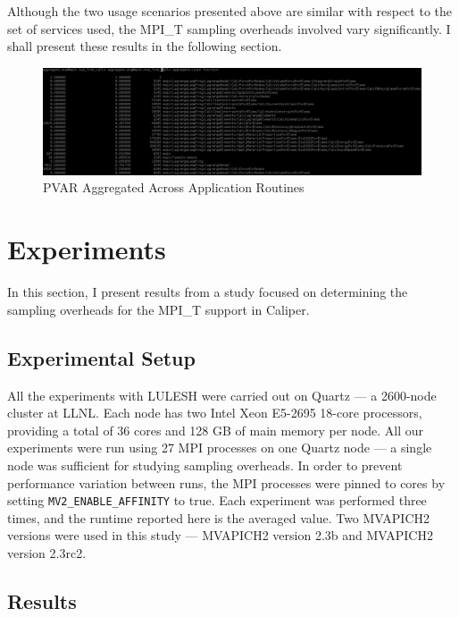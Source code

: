 \par Although the two usage scenarios presented above are similar with respect to the set of services used, the MPI\_T sampling overheads involved vary significantly. I shall present these results in the following section.
\begin{center}
	\begin{figure}[bp!]
         \centering
  \captionsetup{justification=centering}
		\includegraphics[scale=0.8, width=\columnwidth, keepaspectratio]{figures/CALIPER_app_counter_PVAR}
		\caption{PVAR Aggregated Across Application Routines}
		\label{fig:cali-app-counter}
	\end{figure}
\end{center}

\section{Experiments}
In this section, I present results from a study focused on determining the sampling overheads for the MPI\_T support in Caliper.
\subsection{Experimental Setup}
All the experiments with LULESH were carried out on Quartz --- a 2600-node cluster at LLNL. Each node has two Intel Xeon E5-2695 18-core processors, providing a total of 36 cores and 128 GB of main memory per node. All our experiments were run using 27 MPI processes on one Quartz node --- a single node was sufficient for studying sampling overheads. In order to prevent performance variation between runs, the MPI processes were pinned to cores by setting \verb+MV2_ENABLE_AFFINITY+ to true. Each experiment was performed three times, and the runtime reported here is the averaged value. Two MVAPICH2 versions were used in this study --- MVAPICH2 version 2.3b and MVAPICH2 version 2.3rc2. 
\subsection{Results}
